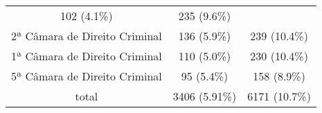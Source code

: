\documentclass[10pt,]{article}
\begin{document}
\begin{longtable}[c]{@{}ccc@{}}
\begin{minipage}[t]{0.16\columnwidth}
102 (4.1\%)
\strut\end{minipage} &
\begin{minipage}[t]{0.24\columnwidth}\centering\strut
235 (9.6\%)
\strut\end{minipage}\tabularnewline
\begin{minipage}[t]{0.39\columnwidth}\centering\strut
2ª Câmara de Direito Criminal
\strut\end{minipage} &
\begin{minipage}[t]{0.16\columnwidth}\centering\strut
136 (5.9\%)
\strut\end{minipage} &
\begin{minipage}[t]{0.24\columnwidth}\centering\strut
239 (10.4\%)
\strut\end{minipage}\tabularnewline
\begin{minipage}[t]{0.39\columnwidth}\centering\strut
1ª Câmara de Direito Criminal
\strut\end{minipage} &
\begin{minipage}[t]{0.16\columnwidth}\centering\strut
110 (5.0\%)
\strut\end{minipage} &
\begin{minipage}[t]{0.24\columnwidth}\centering\strut
230 (10.4\%)
\strut\end{minipage}\tabularnewline
\begin{minipage}[t]{0.39\columnwidth}\centering\strut
5ª Câmara de Direito Criminal
\strut\end{minipage} &
\begin{minipage}[t]{0.16\columnwidth}\centering\strut
95 (5.4\%)
\strut\end{minipage} &
\begin{minipage}[t]{0.24\columnwidth}\centering\strut
158 (8.9\%)
\strut\end{minipage}\tabularnewline
\begin{minipage}[t]{0.39\columnwidth}\centering\strut
total
\strut\end{minipage} &
\begin{minipage}[t]{0.16\columnwidth}\centering\strut
3406 (5.91\%)
\strut\end{minipage} &
\begin{minipage}[t]{0.24\columnwidth}\centering\strut
6171 (10.7\%)
\strut\end{minipage}\tabularnewline
\bottomrule
\end{longtable}
\end{document}

